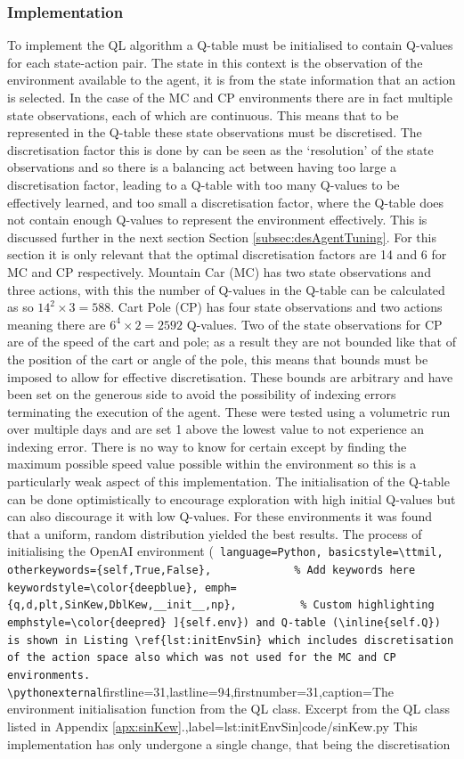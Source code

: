 \documentclass[hidelinks,journal]{IEEEtran}
\newcommand\pythonstyle{\lstset{
language=Python,
basicstyle=\scriptsize\ttm,
otherkeywords={self},             %
keywordstyle=\color{deepblue},
emph={q,d,plt,SinKew,DblKew,__init__,np},          %
emphstyle=\color{deepred},    %
stringstyle=\color{deepgreen},
frame=tb,                         %
numbers=left,
stepnumber=5,
numberfirstline=false,
numbersep=3pt,
captionpos=b,
extendedchars=true,
firstnumber=1,
numberstyle=\tiny\color{mygray},
showstringspaces=false
}}
\newcommand\pythonexternal[2][]{{
\pythonstyle
}}
\def\inline{\lstinline[
language=Python,
basicstyle=\ttmil,
otherkeywords={self,True,False},             %
keywordstyle=\color{deepblue},
emph={q,d,plt,SinKew,DblKew,__init__,np},          %
emphstyle=\color{deepred}
]}
\begin{document}
\subsubsection{Implementation}
\label{subsubsec:desdesArteDevImp}
To implement the QL algorithm a Q-table must be initialised to contain Q-values for each state-action pair. The state in this context is the observation of the environment available to the agent, it is from the state information that an action is selected. In the case of the MC and CP environments there are in fact multiple state observations, each of which are continuous. This means that to be represented in the Q-table these state observations must be discretised. The discretisation factor this is done by can be seen as the ‘resolution’ of the state observations and so there is a balancing act between having too large a discretisation factor, leading to a Q-table with too many Q-values to be effectively learned, and too small a discretisation factor, where the Q-table does not contain enough Q-values to represent the environment effectively. This is discussed further in the next section Section \ref{subsec:desAgentTuning}. For this section it is only relevant that the optimal discretisation factors are 14 and 6 for MC and CP respectively. Mountain Car (MC) has two state observations and three actions, with this the number of Q-values in the Q-table can be calculated as so $14^2 \times 3 = 588$. Cart Pole (CP) has four state observations and two actions meaning there are $6^4 \times 2 = 2592$ Q-values. Two of the state observations for CP are of the speed of the cart and pole; as a result they are not bounded like that of the position of the cart or angle of the pole, this means that bounds must be imposed to allow for effective discretisation. These bounds are arbitrary and have been set on the generous side to avoid the possibility of indexing errors terminating the execution of the agent. These were tested using a volumetric run over multiple days and are set 1 above the lowest value to not experience an indexing error. There is no way to know for certain except by finding the maximum possible speed value possible within the environment so this is a particularly weak aspect of this implementation. The initialisation of the Q-table can be done optimistically to encourage exploration with high initial Q-values but can also discourage it with low Q-values. For these environments it was found that a uniform, random distribution yielded the best results. The process of initialising the OpenAI environment (\inline{self.env}) and Q-table (\inline{self.Q}) is shown in Listing \ref{lst:initEnvSin} which includes discretisation of the action space also which was not used for the MC and CP environments.
\pythonexternal[firstline=31,lastline=94,firstnumber=31,caption=The environment initialisation function from the QL class. Excerpt from the QL class listed in Appendix \ref{apx:sinKew}.,label={lst:initEnvSin}]{code/sinKew.py}
This implementation has only undergone a single change, that being the discretisation 
\end{document}
